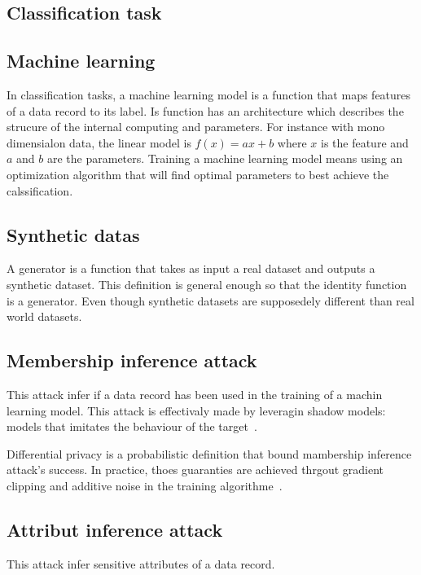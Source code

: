 \subsection{Classification task}
\subsection{Machine learning}
In classification tasks, a machine learning model is a function that maps features of a data record to its label.
Is function has an architecture which describes the strucure of the internal computing and parameters.
For instance with mono dimensialon data, the linear model is $f(x) = ax+b$ where $x$ is the feature and $a$ and $b$ are the parameters.
Training a machine learning model means using an optimization algorithm that will find optimal parameters to best achieve the calssification.

\subsection{Synthetic datas}
A generator is a function that takes as input a real dataset and outputs a synthetic dataset.
This definition is general enough so that the identity function is a generator.
Even though synthetic datasets are supposedely different than real world datasets.

\subsection{Membership inference attack}
This attack infer if a data record has been used in the training of a machin learning model.
This attack is effectivaly made by leveragin shadow models: models that imitates the behaviour of the target~\cite{shokri2017membership}.

Differential privacy is a probabilistic definition that bound mambership inference attack's success.
In practice, thoes guaranties are achieved thrgout gradient clipping and additive noise in the training algorithme~\cite{abadi2016deep}.


\subsection{Attribut inference attack}
This attack infer sensitive attributes of a data record.
